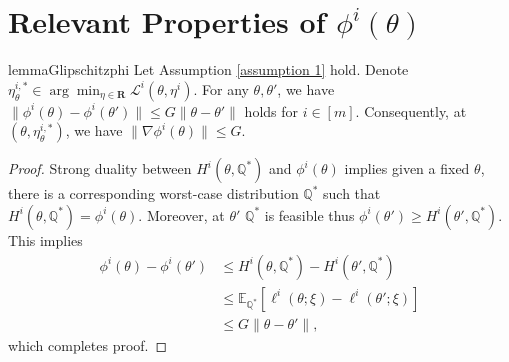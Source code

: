 \documentclass[twoside]{article} %
\theoremstyle{plain}
\theoremstyle{definition}
\theoremstyle{remark}
\newcommand{\fL}{\mathcal{L}}
\begin{document}
\section{Relevant Properties of $\phi^i(\theta)$}\label{Appendix: Relevant Properties of Phi}
\begin{restatable}{lemma}{Glipschitzphi}\label{lemma: gradient bound of phi}
    Let Assumption \ref{assumption 1} hold. Denote $\eta_{{\theta}}^{i,*}\in \arg\min_{{\eta}\in \mathbf{R}}\fL^i({\theta},\eta^i)$. For any $\theta,\theta'$, we have$
        \|\phi^i({\theta})-\phi^i(\theta') \|\leq G\|{\theta}-{\theta}' \|$
holds for $i\in[m]$. Consequently, at $(\theta, \eta_{\theta}^{i,*})$, we have $\|\nabla \phi^i(\theta)\|\leq G$.
\end{restatable}
\begin{proof}
    Strong duality between $H^i(\theta,\mathbb{Q}^*)$ and $\phi^i(\theta)$ implies given a fixed $\theta$, there is a corresponding worst-case distribution $\mathbb{Q}^*$ such that $H^i(\theta,\mathbb{Q}^*) = \phi^i(\theta)$. Moreover, at $\theta'$ $\mathbb{Q}^*$ is feasible thus $\phi^i(\theta')\geq H^i(\theta',\mathbb{Q}^*)$. This implies
    \begin{align}
        \phi^i(\theta) - \phi^i(\theta') &\leq H^i(\theta,\mathbb{Q}^*) - H^i(\theta',\mathbb{Q}^*) \nonumber\\
        &\leq \mathbb{E}_{\mathbb{Q}^*}[\ell^i(\theta;\xi)-{\ell}^i(\theta';\xi)]\nonumber\\
        &\leq G\|\theta-\theta'\|,
    \end{align}
    which completes proof. 
\end{proof}
    
\end{document}
